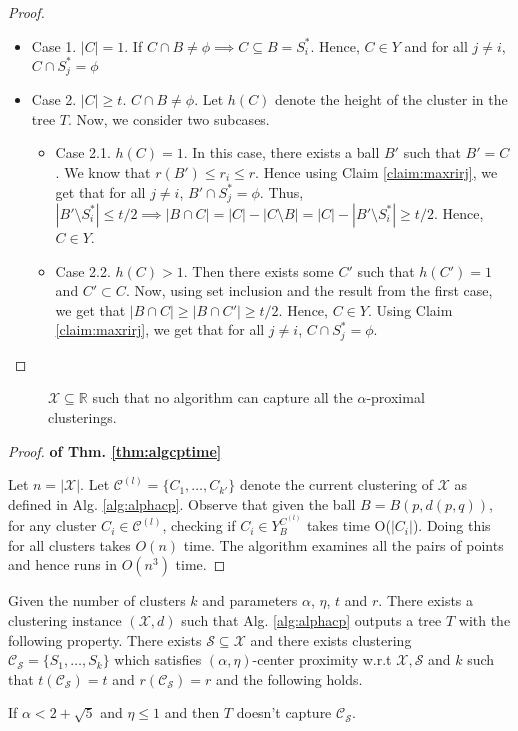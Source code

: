 \documentclass[anon,12pt]{colt2016} %
\newcommand{\mc}{\mathcal}
\begin{document}
\begin{proof}
\begin{itemize}[nolistsep]
\item Case 1. $|C| = 1$. If $C \cap B \neq \phi \implies C \subseteq B = S_i^*$. Hence, $C \in Y$ and for all $j \neq i$, $C \cap S_j^* = \phi$

\item Case 2. $|C|\ge t$. $C \cap B \neq \phi$. Let $h(C)$ denote the height of the cluster in the tree $T$. Now, we consider two subcases.
\begin{itemize}
\renewcommand\labelitemii{$\circ$}
\item Case 2.1. $h(C) = 1$. In this case, there exists a ball $B'$ such that $B' = C$. We know that $r(B') \le r_i \le r$. Hence using Claim \ref{claim:maxrirj}, we get that for all $j \neq i$, $B' \cap S_j^* = \phi$. Thus, $|B'\setminus S_i^*| \le t/2 \implies |B\cap C| = |C| - |C\setminus B| = |C| - |B'\setminus S_i^*| \ge t/2$. Hence, $C \in Y$.

\item Case 2.2. $h(C) > 1$. Then there exists some $C'$ such that $h(C') = 1$ and $C' \subset C$. Now, using set inclusion and the result from the first case, we get that $|B\cap C| \ge |B\cap C'| \ge t/2$. Hence, $C \in Y$. Using Claim \ref{claim:maxrirj}, we get that for all $j \neq i$, $C \cap S_j^* = \phi$.
\end{itemize} 
\end{itemize}
\end{proof}

\begin{figure}

\caption{$\mc X \subseteq \mathbb{R}$ such that no algorithm can capture all the $\alpha$-proximal clusterings. } 
\label{fig:nosparsealg}
\end{figure}


\begin{proof}\textbf{ of Thm. \ref{thm:algcptime}}

Let $n = |\mc X|$. Let $\mc C^{(l)} =\{C_1, \ldots, C_{k'}\}$ denote the current clustering of $\mc X$ as defined in Alg. \ref{alg:alphacp}. Observe that given the ball $B = B(p, d(p, q))$, for any cluster $C_i \in \mc C^{(l)}$, checking if $C_i \in Y_B^{C^{(l)}}$ takes time O($|C_i|$). Doing this for all clusters takes $O(n)$ time. The algorithm examines all the pairs of points and hence runs in $O(n^3)$ time.
\end{proof}


\begin{theorem}
\label{thm:algAlphacp}
Given the number of clusters $k$ and parameters $\alpha$, $\eta$, $t$ and $r$. There exists a clustering instance $(\mc X, d)$ such that Alg. \ref{alg:alphacp} outputs a tree $T$ with the following property. There exists $\mc S \subseteq \mc X$ and there exists clustering $\mc C_{\mc S} = \{S_1, \ldots, S_k\}$ which satisfies $(\alpha, \eta)$-center proximity w.r.t $\mc X, \mc S$ and $k$ such that $ t(\mc C_{\mc S}) = t$ and $r(\mc C_{\mc S}) = r$ and the following holds. 

If $\alpha < 2 + \sqrt 5$ and $\eta \le 1$ and then $T$ doesn't capture $\mc C_{\mc S}$.
\end{theorem}
\end{document}
